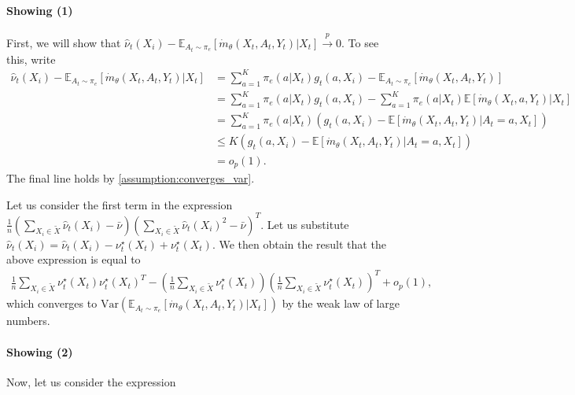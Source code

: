 \documentclass[11pt]{article}
\newcommand{\E}{\mathbb{E}}
\newcommand{\Var}{\mathrm{Var}}
\begin{document}
\begin{appendix}
\paragraph{Showing (1)}

First, we will show that $\hat{\nu}_{t}(X_i) - \E_{A_{t} \sim \pi_{e}} \left[ \dot{m}_{\theta}(X_t,A_t,Y_t) |X_{t} \right]\overset{p}{\to} 0$. To see this, write
\begin{align*}
\hat{\nu}_{t}(X_i) - \E_{A_{t} \sim \pi_{e}} \left[ \dot{m}_{\theta}(X_t,A_t,Y_t) |X_{t} \right] &= \sum_{a = 1}^K \pi_{e}(a|X_{t})g_{t}(a,X_i) - \E_{A_{t} \sim \pi_{e}} \left[ \dot{m}_{\theta}(X_t,A_t,Y_t) \right] \\ 
&= \sum_{a=1}^K \pi_{e}(a|X_{t})g_{t}(a,X_i) - \sum_{a=1}^K \pi_{e}(a|X_{t}) \E\left[ \dot{m}_{\theta}(X_t,a,Y_t) | X_t\right] \\
&= \sum_{a=1}^K \pi_{e}(a|X_{t}) \left(g_{t}(a,X_i)  - \E\left[ \dot{m}_{\theta}(X_t,A_t,Y_t) | A_t=a, X_t\right] \right) \\
&\le K \left(g_{t}(a,X_i)  - \E\left[ \dot{m}_{\theta}(X_t,A_t,Y_t) | A_t=a, X_t\right] \right)\\
&=o_{p}(1).
\end{align*}
The final line holds by \cref{assumption:converges_var}.

Let us consider the first term in the expression $    \frac{1}{n}\left( \sum_{X_{i} \in \tilde{X}} \hat{\nu}_{t}(X_i) - \bar{\nu} \right)\left( \sum_{X_{i} \in \tilde{X}} \hat{\nu}_{t}(X_i)^{2} - \bar{\nu} \right)^{T}$. Let us substitute $\hat{\nu}_{t}(X_i) = \hat{\nu}_{t}(X_i) - \nu^{\star}_{t}(X_t) + \nu^{\star}_{t}(X_t)$. We then obtain the result that the above expression is equal to 
\begin{align*}
    \frac{1}{n} \sum_{X_{i} \in \tilde{X}} \nu^{\star}_{t}(X_t)\nu^{\star}_{t}(X_t)^{T} - \left(\frac{1}{n} \sum_{X_{i} \in \tilde{X}} \nu^{\star}_{t}(X_t) \right) \left(\frac{1}{n} \sum_{X_{i} \in \tilde{X}} \nu^{\star}_{t}(X_t) \right)^{T}+ o_{p}(1),
\end{align*}
which converges to  $\Var\left(\E_{A_{t} \sim \pi_{e}} \left[ \dot{m}_{\theta}(X_t,A_t,Y_t) |X_{t} \right]\right)$ by the weak law of large numbers. 


\paragraph{Showing (2)} Now, let us consider the expression 


\end{appendix}
\end{document}
